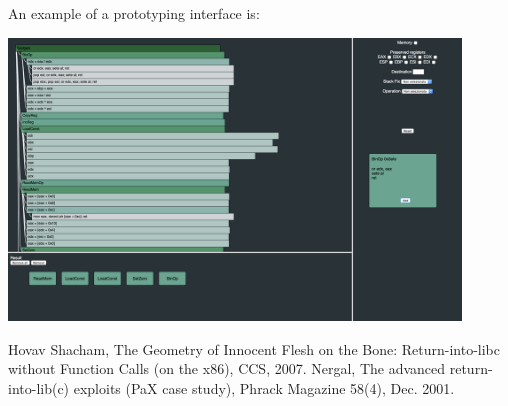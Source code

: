 \documentclass[11pt]{article}
\begin{document}
An example of a prototyping interface is:

\begin{center}
  \includegraphics[width=0.9\textwidth]{ropvis-prototype}
\end{center}




\begin{thebibliography}{99}
    Hovav Shacham,
    The Geometry of Innocent Flesh on the Bone: Return-into-libc without Function Calls (on the x86),
    CCS,
    2007.
    Nergal,
    The advanced return-into-lib(c) exploits (PaX case study),
    Phrack Magazine 58(4),
    Dec. 2001.

\end{thebibliography}
\end{document}
